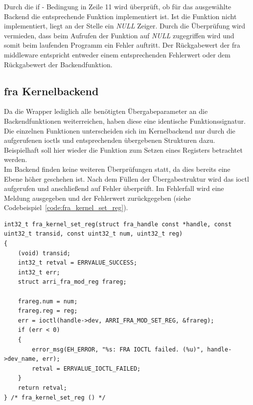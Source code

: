 Durch die if - Bedingung in Zeile 11 wird überprüft, ob für das ausgewählte Backend die entsprechende Funktion implementiert ist. Ist die Funktion nicht implementiert, liegt an der Stelle ein \textit{NULL} Zeiger. Durch die Überprüfung wird vermieden, dass beim Aufrufen der Funktion auf \textit{NULL} zugegriffen wird und somit beim laufenden Programm ein Fehler auftritt. Der Rückgabewert der \ac{fra} \gls{middleware} entspricht entweder einem entsprechenden Fehlerwert oder dem Rückgabewert der Backendfunktion. 


\subsection{\acs{fra} Kernelbackend}
Da die Wrapper lediglich alle benötigten Übergabeparameter an die Backendfunktionen weiterreichen, haben diese eine identische Funktionssignatur. 
Die einzelnen Funktionen unterscheiden sich im Kernelbackend nur durch die aufgerufenen \ac{ioctl}s und entsprechenden übergebenen Strukturen dazu. Beispielhaft soll hier wieder die Funktion zum Setzen eines Registers betrachtet werden. \\


Im Backend finden keine weiteren Überprüfungen statt, da dies bereits eine Ebene höher geschehen ist. Nach dem Füllen der Übergabestruktur wird das \ac{ioctl} aufgerufen und anschließend auf Fehler überprüft. 
Im Fehlerfall wird eine Meldung ausgegeben und der Fehlerwert zurückgegeben (siehe Codebeispiel~\ref{code:fra_kernel_set_reg}). 


\begin{lstfloat}
\begin{lstlisting}
int32_t fra_kernel_set_reg(struct fra_handle const *handle, const uint32_t transid, const uint32_t num, uint32_t reg)
{
	(void) transid;
	int32_t retval = ERRVALUE_SUCCESS;
	int32_t err;
	struct arri_fra_mod_reg frareg;
	
	frareg.num = num;
	frareg.reg = reg;
	err = ioctl(handle->dev, ARRI_FRA_MOD_SET_REG, &frareg);
	if (err < 0)
	{
		error_msg(EH_ERROR, "%s: FRA IOCTL failed. (%u)", handle->dev_name, err);
		retval = ERRVALUE_IOCTL_FAILED;
	}  
	return retval;
} /* fra_kernel_set_reg () */
\end{lstlisting}
\end{lstfloat}


